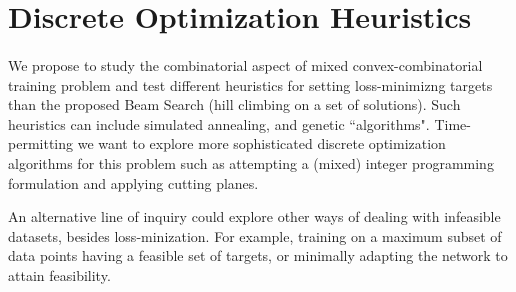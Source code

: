 \section{Discrete Optimization Heuristics}\label{heuristics}
\paragraph{}
We propose to study the combinatorial aspect of mixed convex-combinatorial training problem and test different heuristics for setting loss-minimizng targets than the proposed Beam Search (hill climbing on a set of solutions). Such heuristics can include simulated annealing, and genetic ``algorithms". Time-permitting we want to explore more sophisticated discrete optimization algorithms for this problem such as attempting a (mixed) integer programming formulation and applying cutting planes.

An alternative line of inquiry could explore other ways of dealing with infeasible datasets, besides loss-minization. For example, training on a maximum subset of data points having a feasible set of targets, or minimally adapting the network to attain feasibility.